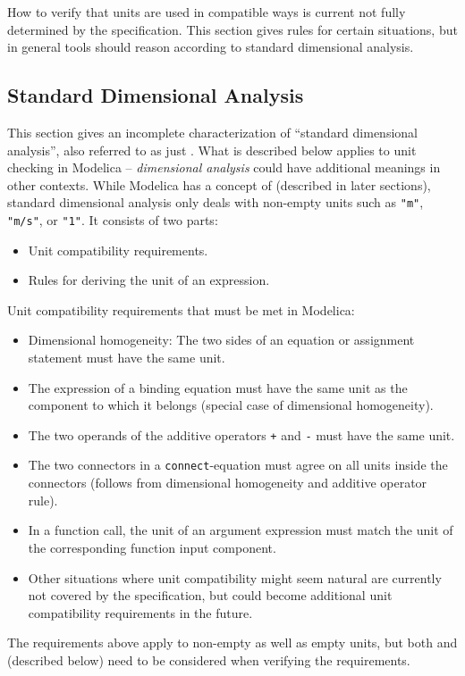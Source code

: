 How to verify that units are used in compatible ways is current not fully determined by the specification.
This section gives rules for certain situations, but in general tools should reason according to standard dimensional analysis.


\subsection{Standard Dimensional Analysis}\label{standard-dimensional-analysis}

This section gives an incomplete characterization of ``standard dimensional analysis'', also referred to as just .
What is described below applies to unit checking in Modelica -- \emph{dimensional analysis} could have additional meanings in other contexts.
While Modelica has a concept of  (described in later sections), standard dimensional analysis only deals with non-empty units such as \lstinline!"m"!, \lstinline!"m/s"!, or \lstinline!"1"!.
It consists of two parts:
\begin{itemize}
\item
  Unit compatibility requirements.
\item
  Rules for deriving the unit of an expression.
\end{itemize}

Unit compatibility requirements that must be met in Modelica:
\begin{itemize}
\item
  Dimensional homogeneity: The two sides of an equation or assignment statement must have the same unit.
\item
  The expression of a binding equation must have the same unit as the component to which it belongs (special case of dimensional homogeneity).
\item
  The two operands of the additive operators \lstinline!+! and \lstinline!-! must have the same unit.
\item
  The two connectors in a \lstinline!connect!-equation must agree on all units inside the connectors (follows from dimensional homogeneity and additive operator rule).
\item
  In a function call, the unit of an argument expression must match the unit of the corresponding function input component.
\item
  Other situations where unit compatibility might seem natural are currently not covered by the specification, but could become additional unit compatibility requirements in the future.
\end{itemize}
The requirements above apply to non-empty as well as empty units, but both  and  (described below) need to be considered when verifying the requirements.

